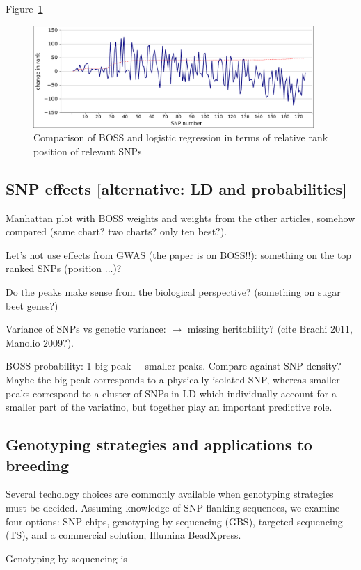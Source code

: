 Figure~\ref{fig:rank}

\begin{figure}
\includegraphics[width=0.95\textwidth]{rank.pdf}
\caption{Comparison of BOSS and logistic regression in terms of relative
rank position of relevant SNPs}
\label{fig:rank} 
\end{figure}


\subsection{SNP effects [alternative: LD and probabilities]}
Manhattan plot with BOSS weights and weights from the other articles,
somehow compared (same chart? two charts? only ten best?).

Let's not use effects from GWAS (the paper is on BOSS!!): something on
the top ranked SNPs (position ...)?

Do the peaks make sense from the biological perspective? (something on
sugar beet genes?)

Variance of SNPs vs genetic variance: $\rightarrow$ missing
heritability? (cite Brachi 2011, Manolio 2009?).

BOSS probability: 1 big peak + smaller peaks. Compare against SNP
density? Maybe the big peak corresponds to a physically isolated SNP,
whereas smaller peaks correspond to a cluster of SNPs in LD which
individually account for a smaller part of the variatino, but together
play an important predictive role. 


\subsection{Genotyping strategies and applications to breeding}
Several techology choices are commonly available when genotyping strategies
must be decided. Assuming knowledge of SNP flanking sequences, we examine
four options: SNP chips, genotyping by sequencing (GBS), targeted sequencing (TS),
and a commercial solution, Illumina BeadXpress.


Genotyping by sequencing is 

